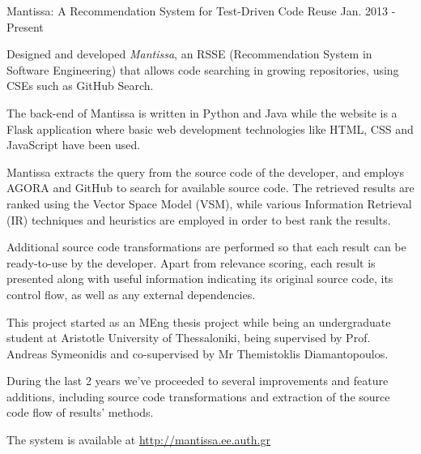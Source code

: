 \begin{cventries}
  \cventry
    {Mantissa: A Recommendation System for Test-Driven Code Reuse} %
	{}
	{}
    {Jan. 2013 - Present} %
    {
      \begin{cvitems} %
        \item {Designed and developed \textit{Mantissa}, an RSSE (Recommendation System in Software Engineering) that allows code searching in growing repositories, using CSEs such as GitHub Search.} 
        \item{The back-end of Mantissa is written in Python and Java while the website is a Flask application where basic web development technologies like HTML, CSS and JavaScript have been used.}
        \item {Mantissa extracts the query from the source code of the developer, and employs AGORA and GitHub to search for available source code. The retrieved results are ranked using the Vector Space Model (VSM), while various Information Retrieval (IR) techniques and heuristics are employed in order to best rank the results.}
		\item {Additional source code transformations are performed so that each result can be ready-to-use by the developer. Apart from relevance scoring, each result is presented along with useful information indicating its original source code, its control flow, as well as any external dependencies.}
		\item {This project started as an MEng thesis project while being an undergraduate student at Aristotle University of Thessaloniki, being supervised by Prof. Andreas Symeonidis and co-supervised by Mr Themistoklis Diamantopoulos.}
		\item{During the last 2 years we've proceeded to several improvements and feature additions, including source code transformations and extraction of the source code flow of results' methods.}
		\item {The system is available at \url{http://mantissa.ee.auth.gr}}
      \end{cvitems}
    }
\end{cventries}

